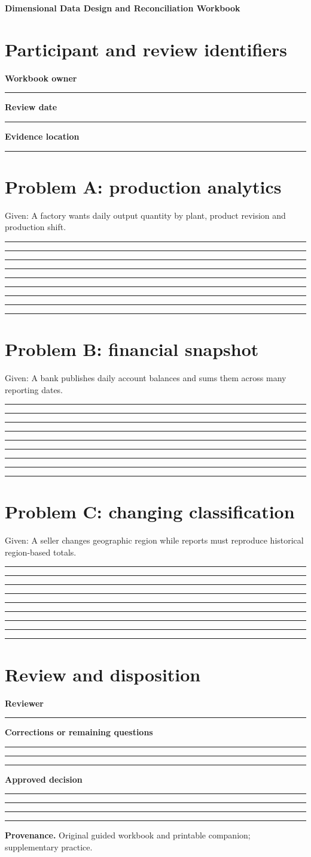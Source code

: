 \documentclass[11pt,letterpaper]{article}
\newcommand{\ResponseLine}{\par\vspace{1.05em}\noindent\rule{\linewidth}{0.4pt}\par}
\newcommand{\ResponseArea}{\ResponseLine\ResponseLine\ResponseLine}
\begin{document}
\begin{center}
{\LARGE\bfseries\color{navy} Dimensional Data Design and Reconciliation Workbook}\par
\vspace{0.25em}{\large Printable Blank | response fields left empty}\par
{}
\end{center}
\vspace{0.8em}
\section{Participant and review identifiers}
\textbf{Workbook owner}\ResponseLine\textbf{Review date}\ResponseLine\textbf{Evidence location}\ResponseLine
\section{Problem A: production analytics}
Given: A factory wants daily output quantity by plant, product revision and production shift.


\ResponseArea\ResponseArea\ResponseArea
\section{Problem B: financial snapshot}
Given: A bank publishes daily account balances and sums them across many reporting dates.


\ResponseArea\ResponseArea\ResponseArea
\section{Problem C: changing classification}
Given: A seller changes geographic region while reports must reproduce historical region-based totals.


\ResponseArea\ResponseArea\ResponseArea
\section{Review and disposition}
\textbf{Reviewer}\ResponseLine\textbf{Corrections or remaining questions}\ResponseArea\textbf{Approved decision}\ResponseArea
\vfill
\hrule
{\footnotesize\textbf{Provenance.} Original guided workbook and printable companion; supplementary practice.}
\end{document}
